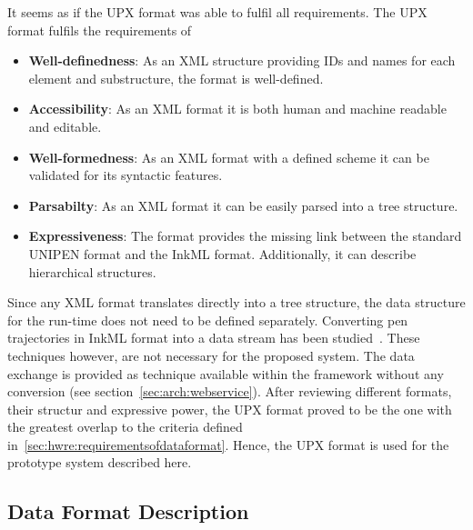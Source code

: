 It seems as if the UPX format was able to fulfil all requirements.
The UPX format fulfils the requirements of
\begin{itemize}
  \item \textbf{Well-definedness}: As an XML structure providing IDs and names 
        for each element and substructure, the format is well-defined.

  \item \textbf{Accessibility}: As an XML format it is both human and machine
        readable and editable.

  \item \textbf{Well-formedness}: As an XML format with a defined scheme it can
        be validated for its syntactic features.

  \item \textbf{Parsabilty}: As an XML format it can be easily parsed into a
        tree structure.

  \item \textbf{Expressiveness}: The format provides the missing link between the
        standard UNIPEN format and the InkML format. Additionally, it can 
        describe hierarchical structures.
\end{itemize}
Since any XML format translates directly into a tree structure, the data 
structure for the run-time does not need to be defined separately.
Converting pen trajectories in InkML format into a data stream has been 
studied~. These techniques however, are not necessary 
for the proposed system. The data exchange is provided as technique available
within the framework without any conversion (see 
section~\ref{sec:arch:webservice}).
After reviewing different formats, their structur and expressive power,
the UPX format proved to be the one with the greatest overlap to the
criteria defined in~\ref{sec:hwre:requirementsofdataformat}. Hence, the
UPX format is used for the prototype system described here.

\subsection{Data Format Description}
\label{sec:hwre:dataformatdescription}



